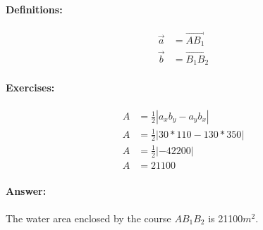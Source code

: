 \paragraph{Definitions:}
\begin{align}
    \vec{a} &= \vec{AB_1} \\
    \vec{b} &= \vec{B_1B_2}
\end{align}

\paragraph{Exercises:}
\begin{align}
   A &= \frac{1}{2}|a_xb_y-a_yb_x| \\ 
   A &= \frac{1}{2}|30*110-130*350| \\ 
   A &= \frac{1}{2}|-42200| \\ 
   A &= 21100
\end{align}

\paragraph{Answer:}
The water area enclosed by the course $AB_1B_2$ is 21100$m^2$.
